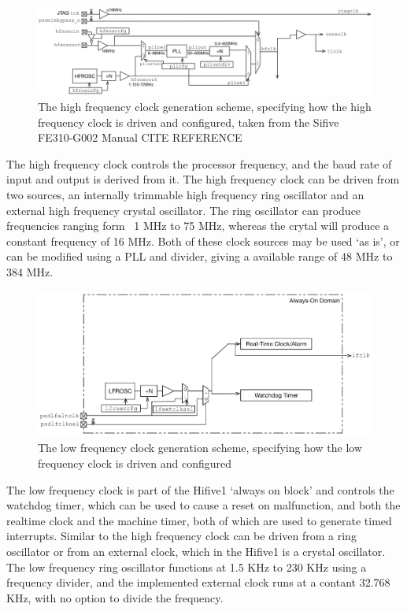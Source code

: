 \begin{figure}[H]
    \includegraphics[width=0.9\columnwidth]{figures/hfclock.png}
    \caption[High Frequency Clock Diagram]{The high frequency clock generation scheme, specifying how the high frequency clock is driven and configured, taken from the Sifive FE310-G002 Manual CITE REFERENCE}
\end{figure}
The high frequency clock controls the processor frequency, and the baud rate of input and output is derived from it. The high frequency clock can be driven from two sources, an internally trimmable high frequency ring oscillator and an external high frequency crystal oscillator. The ring oscillator can produce frequencies ranging form ~1 MHz to 75 MHz, whereas the crytal will produce a constant frequency of 16 MHz. Both of these clock sources may be used `as is', or can be modified using a PLL and divider, giving a available range of 48 MHz to 384 MHz. 
\\
\begin{figure}[H]
    \includegraphics[width=0.9\columnwidth]{figures/lfclock.png}
    \caption[Low Frequency Clock Diagram]{The low frequency clock generation scheme, specifying how the low frequency clock is driven and configured}
\end{figure}
The low frequency clock is part of the Hifive1 `always on block' and controls the watchdog timer, which can be used to cause a reset on malfunction, and both the realtime clock and the machine timer, both of which are used to generate timed interrupts. Similar to the high frequency clock can be driven from a ring oscillator or from an external clock, which in the Hifive1 is a crystal oscillator. The low frequency ring oscillator functions at 1.5 KHz to 230 KHz using a frequency divider, and the implemented external clock runs at a contant 32.768 KHz, with no option to divide the frequency.
